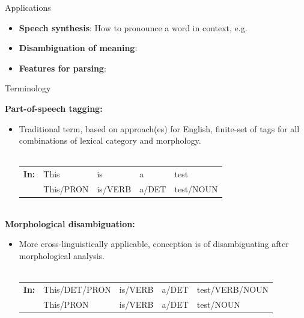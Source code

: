 \documentclass{beamer}
\begin{document}
\begin{frame}{Applications}

\begin{itemize}
  \item \textbf{Speech synthesis}: How to pronounce a word in context, e.g. 
  \item \textbf{Disambiguation of meaning}:
  \item \textbf{Features for parsing}:

\end{itemize}


\end{frame}

\begin{frame}{Terminology}


\textbf{Part-of-speech tagging:}
   \begin{itemize}
     \item Traditional term, based on approach(es) for English, finite-set of 
       tags for all combinations of lexical category and morphology. \\ ~ \\
       \begin{tabular}{llllp{}}
         \hline
         \textbf{In:} & This & is & a & test \\
         ~ & This/PRON & is/VERB & a/DET & test/NOUN \\
         \hline
       \end{tabular}
   \end{itemize}
~\\
\textbf{Morphological disambiguation:}
   \begin{itemize}
      \item More cross-linguistically applicable, conception is of disambiguating
        after morphological analysis. \\  ~ \\
       \begin{tabular}{lllll}
         \hline
         \textbf{In:} & This/DET/PRON & is/VERB & a/DET & test/VERB/NOUN \\
         ~ & This/PRON & is/VERB & a/DET & test/NOUN \\
         \hline
       \end{tabular}
   \end{itemize}  

\end{frame}
\end{document}
